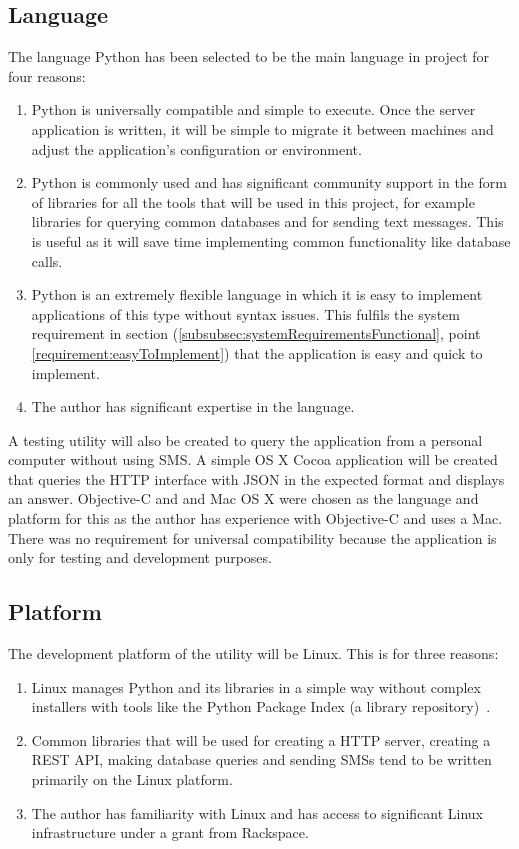 \documentclass[authoryearcitations]{UoYCSproject}
\begin{document}
\subsection{Language}
\label{section:designLanguage}
The language Python has been selected to be the main language in project for four reasons:
\begin{enumerate}
  \item Python is universally compatible and simple to execute.  Once the server application is written, it will be simple to migrate it between machines and adjust the application's configuration or environment.
  \item Python is commonly used and has significant community support in the form of libraries for all the tools that will be used in this project, for example libraries for querying common databases and for sending text messages.  This is useful as it will save time implementing common functionality like database calls.
  \item Python is an extremely flexible language in which it is easy to implement applications of this type without syntax issues.  This fulfils the system requirement in section (\ref{subsubsec:systemRequirementsFunctional}, point \ref{requirement:easyToImplement}) that the application is easy and quick to implement.
  \item The author has significant expertise in the language.
\end{enumerate}

A testing utility will also be created to query the application from a personal computer without using SMS.  A simple OS X Cocoa application will be created that queries the HTTP interface with JSON in the expected format and displays an answer.  Objective-C and and Mac OS X were chosen as the language and platform for this as the author has experience with Objective-C and uses a Mac.  There was no requirement for universal compatibility because the application is only for testing and development purposes.

\subsection{Platform}
The development platform of the utility will be Linux.  This is for three reasons:
\begin{enumerate}
  \item Linux manages Python and its libraries in a simple way without complex installers with tools like the Python Package Index (a library repository)~\cite{pypi}.
  \item Common libraries that will be used for creating a HTTP server, creating a REST API, making database queries and sending SMSs tend to be written primarily on the Linux platform.
  \item The author has familiarity with Linux and has access to significant Linux infrastructure under a grant from Rackspace.
\end{enumerate}
\end{document}
